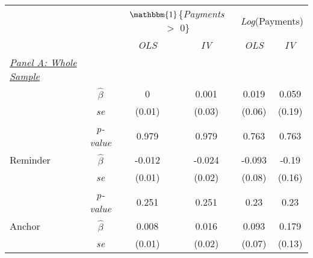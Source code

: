 \begin{tabular}{cccccc}
\tabularnewline \midrule \midrule 
 \addlinespace 
 \addlinespace 

\multicolumn{1}{c}{ } & \multicolumn{1}{c}{ } & \multicolumn{2}{c}{$\mathbbm{1}$\{\textit{Payments} $>$ 0\}} & \multicolumn{2}{c}{\textit{Log}({Payments})} \\

\cmidrule(lr){3-4} \cmidrule(lr){5-6}
 &  & \multicolumn{1}{c}{\textit{OLS}} & \multicolumn{1}{c}{\textit{IV}} & \multicolumn{1}{c}{\textit{OLS}} & \multicolumn{1}{c}{\textit{IV}} \\

\midrule
\multicolumn{1}{l}{\underline{\textit{Panel A: Whole Sample}}} &  &  &  & &\\ 
 \addlinespace 
\multicolumn{1}{l}{Any Treatment} & \multicolumn{1}{c}{\scriptsize $\hat{\beta}$} & \multicolumn{1}{c}{0} & \multicolumn{1}{c}{0.001} & \multicolumn{1}{c}{0.019} & \multicolumn{1}{c}{0.059} \\
\multicolumn{1}{l}{} & \multicolumn{1}{c}{\scriptsize{\textit{se}}} & \multicolumn{1}{c}{(0.01)} & \multicolumn{1}{c}{(0.03)} & \multicolumn{1}{c}{(0.06)} & \multicolumn{1}{c}{(0.19)} \\
\multicolumn{1}{l}{} & \multicolumn{1}{c}{\scriptsize{\textit{p-value}}} & \multicolumn{1}{c}{0.979} & \multicolumn{1}{c}{0.979} & \multicolumn{1}{c}{0.763} & \multicolumn{1}{c}{0.763} \\
\multicolumn{1}{l}{Reminder} & \multicolumn{1}{c}{\scriptsize $\hat{\beta}$} & \multicolumn{1}{c}{-0.012} & \multicolumn{1}{c}{-0.024} & \multicolumn{1}{c}{-0.093} & \multicolumn{1}{c}{-0.19} \\
\multicolumn{1}{l}{} & \multicolumn{1}{c}{\scriptsize{\textit{se}}} & \multicolumn{1}{c}{(0.01)} & \multicolumn{1}{c}{(0.02)} & \multicolumn{1}{c}{(0.08)} & \multicolumn{1}{c}{(0.16)} \\
\multicolumn{1}{l}{} & \multicolumn{1}{c}{\scriptsize{\textit{p-value}}} & \multicolumn{1}{c}{0.251} & \multicolumn{1}{c}{0.251} & \multicolumn{1}{c}{0.23} & \multicolumn{1}{c}{0.23} \\
\multicolumn{1}{l}{Anchor} & \multicolumn{1}{c}{\scriptsize $\hat{\beta}$} & \multicolumn{1}{c}{0.008} & \multicolumn{1}{c}{0.016} & \multicolumn{1}{c}{0.093} & \multicolumn{1}{c}{0.179} \\
\multicolumn{1}{l}{} & \multicolumn{1}{c}{\scriptsize{\textit{se}}} & \multicolumn{1}{c}{(0.01)} & \multicolumn{1}{c}{(0.02)} & \multicolumn{1}{c}{(0.07)} & \multicolumn{1}{c}{(0.13)} \\

\end{tabular}
